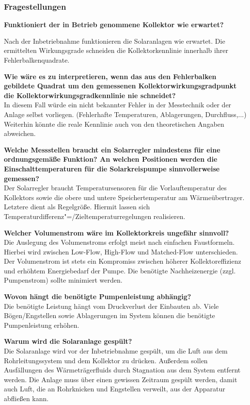 \subsubsection{Fragestellungen}

\textbf{Funktioniert der in Betrieb genommene Kollektor wie erwartet?}

Nach der Inbetriebnahme funktionieren die Solaranlagen wie erwartet. Die ermittelten Wirkungsgrade schneiden die Kollektorkennlinie innerhalb ihrer Fehlerbalkenquadrate.

\textbf{Wie wäre es zu interpretieren, wenn das aus den Fehlerbalken gebildete Quadrat um den gemessenen Kollektorwirkungsgradpunkt die Kollektorwirkungsgradkennlinie nie schneidet?}\\
In diesem Fall würde ein nicht bekannter Fehler in der Messtechnik oder der Anlage selbst vorliegen. (Fehlerhafte Temperaturen, Ablagerungen, Durchfluss,...) Weiterhin könnte die reale Kennlinie auch von den theoretischen Angaben abweichen. 

\textbf{Welche Messstellen braucht ein Solarregler mindestens für eine ordnungsgemäße
	Funktion? An welchen Positionen werden die Einschalttemperaturen für die Solarkreispumpe
	sinnvollerweise gemessen?}\\
Der Solarregler braucht Temperatursensoren für die Vorlauftemperatur des Kollektors sowie die obere und untere Speichertemperatur am Wärmeübertrager. Letztere dient als Regelgröße. Hiermit lassen sich Temperaturdifferenz"=/Zieltemperaturregelungen realisieren. 

\textbf{Welcher Volumenstrom wäre im Kollektorkreis ungefähr sinnvoll?}\\
Die Auslegung des Volumenstroms erfolgt meist nach einfachen Faustformeln. Hierbei wird zwischen Low-Flow, High-Flow und Matched-Flow unterschieden. Der Volumenstrom ist stets ein Kompromiss zwischen höherer Kollektoreffizienz  und erhöhtem Energiebedarf der Pumpe. Die benötigte Nachheizenergie (zzgl. Pumpenstrom) sollte minimiert werden.

\textbf{Wovon hängt die benötigte Pumpenleistung abhängig?}\\
Die benötigte Leistung hängt vom Druckverlust der Einbauten ab. Viele Bögen/Engstellen sowie Ablagerungen im System können die benötigte Pumpenleistung erhöhen.

\textbf{Warum wird die Solaranlage gespült?}\\
Die Solaranlage wird vor der Inbetriebnahme gespült, um die Luft aus dem Rohrleitungssystem und dem Kollektor zu drücken. Außerdem sollen Ausfällungen des Wärmeträgerfluids durch Stagnation aus dem System entfernt werden. Die Anlage muss über einen gewissen Zeitraum gespült werden, damit auch Luft, die an Rohrknicken und Engstellen verweilt, aus der Apparatur abfließen kann. 

